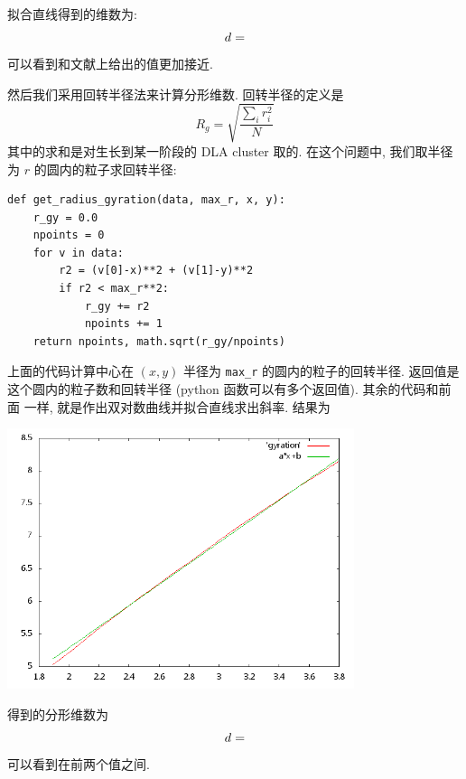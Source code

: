 \documentclass{ctexart}
\begin{document}
拟合直线得到的维数为:
\[
d = \relax
\]
可以看到和文献上给出的值更加接近.

然后我们采用回转半径法来计算分形维数. 回转半径的定义是
\[
R_g = \sqrt{\frac{\sum_i r_i^2}{N}}
\]
其中的求和是对生长到某一阶段的 DLA cluster 取的. 在这个问题中, 我们取半径为
$r$ 的圆内的粒子求回转半径:
\begin{verbatim}
def get_radius_gyration(data, max_r, x, y):
    r_gy = 0.0
    npoints = 0
    for v in data:
        r2 = (v[0]-x)**2 + (v[1]-y)**2
        if r2 < max_r**2:
            r_gy += r2
            npoints += 1
    return npoints, math.sqrt(r_gy/npoints)
\end{verbatim}
上面的代码计算中心在 $(x,y)$ 半径为 \verb|max_r| 的圆内的粒子的回转半径.
返回值是这个圆内的粒子数和回转半径 (python 函数可以有多个返回值). 其余的代码和前面
一样, 就是作出双对数曲线并拟合直线求出斜率. 结果为
\begin{center}
\includegraphics[width=4in]{gyration.png}
\end{center}
得到的分形维数为
\[
d = \relax
\]
可以看到在前两个值之间.
\end{document}
